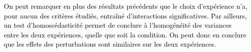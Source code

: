 

\textcolor{black}{On peut remarquer en plus des résultats précédents que le choix d'expérience n'a, pour aucun des critères étudiés, entraîné d'interactions significatives. Par ailleurs, un test d'homoscédasticité \parencite[Chapitre~25, par H. Levene]{olkin_contributions_1960} permet de conclure à l'homogénéité des variances entre les deux expériences, quelle que soit la condition. On peut donc en conclure que les effets des perturbations sont similaires sur les deux expériences.}



%


